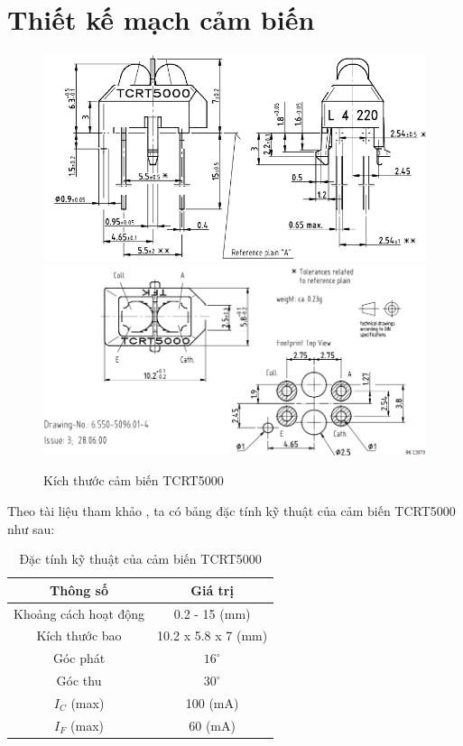     \section{Thiết kế mạch cảm biến}
        \begin{figure}[H]
            \centering
            \includegraphics[width=1\textwidth]{pictures/chapter4/c4_p10_TCRT5000Dimensions1.png}
            \label{fig:4-2}
            \includegraphics[width=1\textwidth]{pictures/chapter4/c4_p11_TCRT5000Dimensions2.png}
            \label{fig:4-3}
            \caption{Kích thước cảm biến TCRT5000}
        \end{figure}
        \hspace*{0.6cm}Theo tài liệu tham khảo \cite{vishay_tcrt5000_1}, ta có bảng đặc tính kỹ thuật của cảm biến TCRT5000 như sau:
        \begin{table}[H]
            \centering
            \begin{tabular}{|c|c|}
                \hline
                \textbf{Thông số} & \textbf{Giá trị} \\
                \hline
                Khoảng cách hoạt động & 0.2 - 15 (mm) \\
                \hline
                Kích thước bao & 10.2 x 5.8 x 7 (mm) \\
                \hline
                Góc phát & $16^{\circ}$ \\
                \hline
                Góc thu & $30^{\circ}$ \\
                \hline
                $I_{C}$ (max) & 100 (mA) \\
                \hline
                $I_{F}$ (max) & 60 (mA) \\
                \hline
            \end{tabular}
            \caption{Đặc tính kỹ thuật của cảm biến TCRT5000}
            \label{tab:4-1}
        \end{table}
